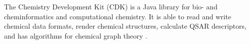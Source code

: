 The Chemistry Development Kit (CDK) is a Java library for bio- and cheminformatics and computational chemistry. It is able to read and write chemical data formats, render chemical structures, calculate QSAR descriptors, and has algorithms for chemical graph theory \cite{Steinbeck_2003}\cite{Steinbeck_2006}. 